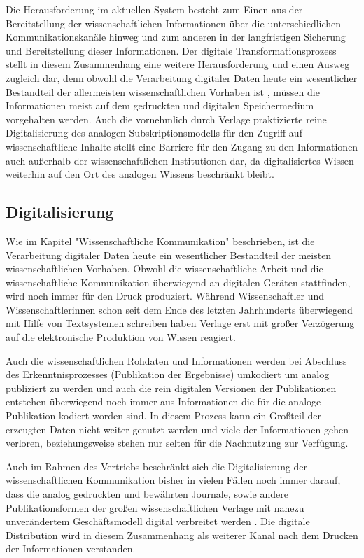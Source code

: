 Die Herausforderung im aktuellen System besteht zum Einen aus der Bereitstellung der wissenschaftlichen Informationen über die unterschiedlichen Kommunikationskanäle hinweg und zum anderen in der langfristigen Sicherung und Bereitstellung dieser Informationen. Der digitale Transformationsprozess stellt in diesem Zusammenhang eine weitere Herausforderung und einen Ausweg zugleich dar, denn obwohl die Verarbeitung digitaler Daten heute ein wesentlicher Bestandteil der allermeisten wissenschaftlichen Vorhaben ist \cite{Winkler_2011}, müssen die Informationen meist auf dem gedruckten und digitalen Speichermedium vorgehalten werden. Auch die vornehmlich durch Verlage praktizierte reine Digitalisierung des analogen Subskriptionsmodells für den Zugriff auf wissenschaftliche Inhalte \cite{Hanekop_2014} \cite{BOAI_2012} stellt eine Barriere für den Zugang zu den Informationen auch außerhalb der wissenschaftlichen Institutionen dar, da digitalisiertes Wissen weiterhin auf den Ort des analogen Wissens beschränkt bleibt.

\subsection{Digitalisierung}

Wie im Kapitel "Wissenschaftliche Kommunikation" beschrieben, ist die Verarbeitung digitaler Daten heute ein wesentlicher Bestandteil der meisten wissenschaftlichen Vorhaben. Obwohl die wissenschaftliche Arbeit und die wissenschaftliche Kommunikation überwiegend an digitalen Geräten stattfinden, wird noch immer für den Druck produziert. Während Wissenschaftler und Wissenschaftlerinnen schon seit dem Ende des letzten Jahrhunderts überwiegend mit Hilfe von Textsystemen schreiben \cite{Brueggemann-Klein_1995} \cite{Bjoerk_2004} haben Verlage erst mit großer Verzögerung auf die elektronische Produktion von Wissen reagiert.

Auch die wissenschaftlichen Rohdaten und Informationen werden bei Abschluss des Erkenntnisprozesses (Publikation der Ergebnisse) umkodiert um analog publiziert zu werden und auch die rein digitalen Versionen der Publikationen entstehen überwiegend noch immer aus Informationen die für die analoge Publikation kodiert worden sind. In diesem Prozess kann ein Großteil der erzeugten Daten nicht weiter genutzt werden und viele der Informationen gehen verloren, beziehungsweise stehen nur selten für die Nachnutzung zur Verfügung.

Auch im Rahmen des Vertriebs beschränkt sich die Digitalisierung der wissenschaftlichen Kommunikation bisher in vielen Fällen noch immer darauf, dass die analog gedruckten und bewährten Journale, sowie andere Publikationsformen der großen wissenschaftlichen Verlage mit nahezu unverändertem Geschäftsmodell digital verbreitet werden \cite{Hanekop_2014} \cite[:179]{Fehling_2014}. Die digitale Distribution wird in diesem Zusammenhang als weiterer Kanal nach dem Drucken der Informationen verstanden.

